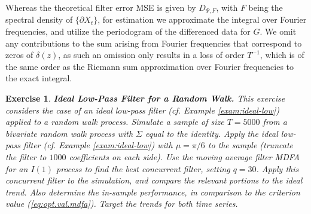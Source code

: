 \documentclass[a4paper]{book}
\newtheorem{Exercise}{Exercise}
\begin{document}
   
  Whereas the theoretical filter error MSE is given by $D_{\Psi, F}$, 
  with $F$ being the spectral density of $\{ \partial X_t \}$,
 for estimation we approximate the integral over Fourier frequencies, 
 and utilize the periodogram of the differenced data for $G$.
 We omit any contributions to the sum arising from Fourier frequencies
 that correspond to zeros of $\delta (z)$, as such an omission
 only results in a loss of order $T^{-1}$, which is of the same order
 as the Riemann sum approximation over Fourier frequencies to the exact integral.


\begin{Exercise} {\bf  Ideal Low-Pass Filter for a Random Walk.} \rm
\label{exer:rwtrend-mdfa}
This exercise considers the case of an ideal low-pass filter
 (cf. Example \ref{exam:ideal-low}) 
 applied to a random walk process.
 Simulate a sample of size $T=5000$ from a
  bivariate random walk process with 
  $\Sigma$ equal to the identity.  
      Apply the   ideal low-pass filter (cf. Example \ref{exam:ideal-low}) with 
  $\mu = \pi/6$ to the sample (truncate the filter to $1000$ coefficients on each side).  
 Use the moving average filter  MDFA  for an $I(1)$ process  to find the best
 concurrent filter, setting $q= 30$. 
   Apply this concurrent filter 
 to the simulation, and compare the relevant portions to the ideal trend.
 Also determine the in-sample performance, in comparison to the criterion value
 (\ref{eq:opt.val.mdfa}).   Target the trends for both time series.
\end{Exercise}
\end{document}
